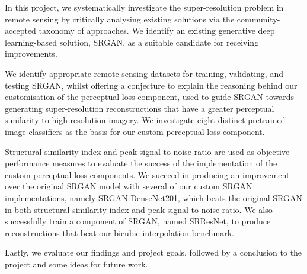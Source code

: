 In this project, we systematically investigate the super-resolution problem in remote sensing by critically analysing existing solutions via the community-accepted taxonomy of approaches. We identify an existing generative deep learning-based solution, SRGAN, as a suitable candidate for receiving improvements.

We identify appropriate remote sensing datasets for training, validating, and testing SRGAN, whilst offering a conjecture to explain the reasoning behind our customisation of the perceptual loss component, used to guide SRGAN towards generating super-resolution reconstructions that have a greater perceptual similarity to high-resolution imagery. We investigate eight distinct pretrained image classifiers as the basis for our custom perceptual loss component.

Structural similarity index and peak signal-to-noise ratio are used as objective performance measures to evaluate the success of the implementation of the custom perceptual loss components. We succeed in producing an improvement over the original SRGAN model with several of our custom SRGAN implementations, namely SRGAN-DenseNet201, which beats the original SRGAN in both structural similarity index and peak signal-to-noise ratio. We also successfully train a component of SRGAN, named SRResNet, to produce reconstructions that beat our bicubic interpolation benchmark.

Lastly, we evaluate our findings and project goals, followed by a conclusion to the project and some ideas for future work.
